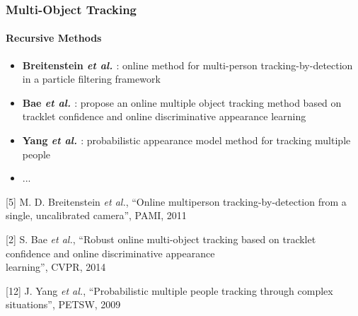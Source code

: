 \begin{frame}
	\frametitle{Multi-Object Tracking}
	\framesubtitle{Recursive Methods}
	
	\Large
	
	\vspace{0.05cm}
	
	\begin{itemize}
		\item \textbf{Breitenstein \emph{et al.} \cite{Breitenstein11}}: online method for
			  multi-person tracking-by-detection in a particle filtering framework
		\item \textbf{Bae \emph{et al.} \cite{Bae14}}: propose an online multiple object
			  tracking method based on tracklet confidence and online discriminative appearance learning
		\item \textbf{Yang \emph{et al.} \cite{Yang09}}: probabilistic appearance model
			  method for tracking multiple people
		\item ...
	\end{itemize}
	
	\vspace{0.15cm}
	
	\tiny
	
	[5] M. D. Breitenstein \emph{et al.}, ``Online multiperson tracking-by-detection from a single,
		uncalibrated camera'', PAMI, 2011
	
	\vspace{0.05cm}
	
	[2] S. Bae \emph{et al.}, ``Robust online multi-object tracking based on tracklet confidence and
		online discriminative appearance\\ \hspace{0.25cm} learning'', CVPR, 2014
	
	\vspace{-0.19cm}
	
	[12] J. Yang \emph{et al.}, ``Probabilistic multiple people tracking through complex situations'',
		 PETSW, 2009
\end{frame}

